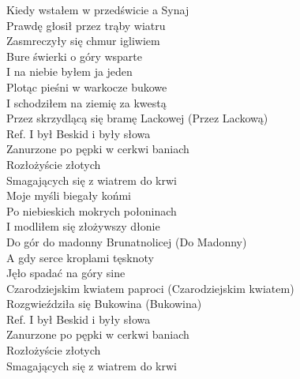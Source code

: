 
\begin{flushleft}
Kiedy wstałem w przedświcie a Synaj \\
Prawdę głosił przez trąby wiatru \\
Zasmreczyły się chmur igliwiem \\
Bure świerki o góry wsparte \\
I na niebie byłem ja jeden \\
Plotąc pieśni w warkocze bukowe \\
I schodziłem na ziemię za kwestą \\
Przez skrzydlącą się bramę Lackowej (Przez Lackową)\\
\vskip 3mm
Ref. I był Beskid i były słowa \tab{}\\
\hspace{0.9cm}Zanurzone po pępki w cerkwi baniach\\
\hspace{0.9cm}Rozłożyście złotych \tab{}\\
\hspace{0.9cm}Smagających się z wiatrem do krwi\\
\vskip 3mm
Moje myśli biegały końmi \\
Po niebieskich mokrych połoninach \\
I modliłem się złożywszy dłonie \\
Do gór do madonny Brunatnolicej (Do Madonny)\\
A gdy serce kroplami tęsknoty \\
Jęło spadać na góry sine \\
Czarodziejskim kwiatem paproci (Czarodziejskim kwiatem)\\
Rozgwieździła się Bukowina (Bukowina)\\
\vskip 3mm
Ref. I był Beskid i były słowa\\
\hspace{0.9cm}Zanurzone po pępki w cerkwi baniach\\
\hspace{0.9cm}Rozłożyście złotych \\
\hspace{0.9cm}Smagających się z wiatrem do krwi \\
\end{flushleft}
\clearpage
